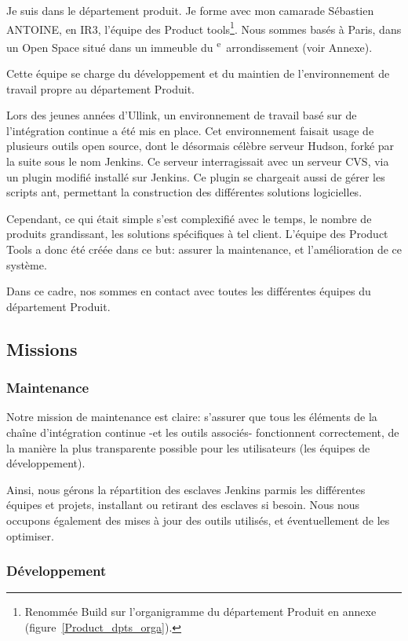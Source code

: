 \documentclass[a4paper, 12pt]{article}
\begin{document}
Je suis dans le département produit. Je forme avec mon camarade Sébastien ANTOINE, en IR3, l'équipe des Product tools\footnote{Renommée Build sur l'organigramme du département Produit en annexe (figure~\ref{Product_dpts_orga}).}. Nous sommes basés à Paris, dans un Open Space situé dans un immeuble du \textsc{}\textsuperscript{e}~arrondissement (voir Annexe).

Cette équipe se charge du développement et du maintien de l'environnement de travail propre au département Produit.

Lors des jeunes années d'Ullink, un environnement de travail basé sur de l'intégration continue a été mis en place. Cet environnement faisait usage de plusieurs outils open source, dont le désormais célèbre serveur Hudson, forké par la suite sous le nom Jenkins. Ce serveur interragissait avec un serveur CVS, via un plugin modifié installé sur Jenkins. Ce plugin se chargeait aussi de gérer les scripts ant, permettant la construction des différentes solutions logicielles.

Cependant, ce qui était simple s'est complexifié avec le temps, le nombre de produits grandissant, les solutions spécifiques à tel client. L'équipe des Product Tools a donc été créée dans ce but: assurer la maintenance, et l'amélioration de ce système.

Dans ce cadre, nos sommes en contact avec toutes les différentes équipes du département Produit.

\subsection{Missions}
\subsubsection{Maintenance}

Notre mission de maintenance est claire: s'assurer que tous les éléments de la chaîne d'intégration continue -et les outils associés- fonctionnent correctement, de la manière la plus transparente possible pour les utilisateurs (les équipes de développement).

Ainsi, nous gérons la répartition des esclaves Jenkins parmis les différentes équipes et projets, installant ou retirant des esclaves si besoin. Nous nous occupons également des mises à jour des outils utilisés, et éventuellement de les optimiser.

\subsubsection{Développement}
\end{document}
